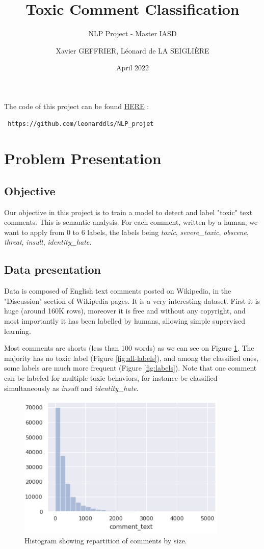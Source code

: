 \documentclass[11pt]{scrartcl}
\title{Toxic Comment Classification}
\subtitle{NLP Project - Master IASD}
\author{Xavier GEFFRIER, Léonard de LA SEIGLIÈRE}
\date{April 2022}
\begin{document}
\maketitle

The code of this project can be found \href{https://github.com/leonarddls/NLP_projet}{HERE} : \begin{verbatim} https://github.com/leonarddls/NLP_projet \end{verbatim}


\section{Problem Presentation}

\subsection{Objective}

Our objective in this project is to train a model to detect and label "toxic" text comments. This is semantic analysis. For each comment, written by a human, we want to apply from 0 to 6 labels, the labels being \textit{toxic}, \textit{severe\_toxic}, \textit{obscene}, \textit{threat}, \textit{insult}, \textit{identity\_hate}.

\subsection{Data presentation}

Data is composed of English text comments posted on Wikipedia, in  the "Discussion" section of Wikipedia pages. It is a very interesting dataset. First it is huge (around 160K rows), moreover it is free and without any copyright, and most importantly it has been labelled by humans, allowing simple supervised learning.

Most comments are shorts (less than 100 words) as we can see on Figure \ref{fig:sizes}. The majority has no toxic label (Figure \ref{fig:all-labels}), and among the classified ones, some labels are much more frequent (Figure \ref{fig:labels}). Note that one comment can be labeled for multiple toxic behaviors, for instance be classified simultaneously as \textit{insult} and \textit{identity\_hate}.

\begin{figure}[H]
    \centering
    \includegraphics[width=10cm]{img/size.PNG}
    \caption{Histogram showing repartition of comments by size.}
    \label{fig:sizes}
\end{figure}
\end{document}
